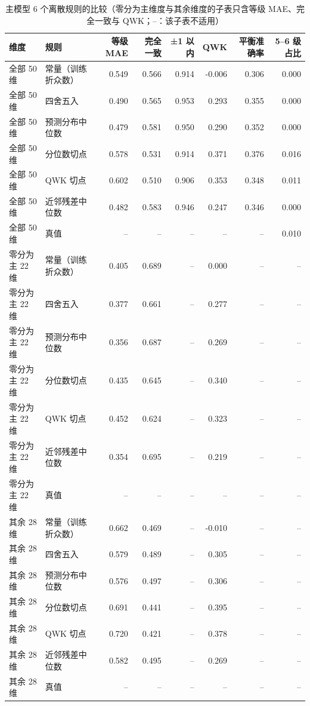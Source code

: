 \begin{table}[htbp]
\centering
\caption{主模型 6 个离散规则的比较（零分为主维度与其余维度的子表只含等级 MAE、完全一致与 QWK；--：该子表不适用）}\label{tab:q1_rules}
\begin{tabular}{llrrrrrr}
\toprule
维度 & 规则 & 等级 MAE & 完全一致 & ±1 以内 & QWK & 平衡准确率 & 5–6 级占比 \\
\midrule
全部 50 维 & 常量（训练折众数） & 0.549 & 0.566 & 0.914 & -0.006 & 0.306 & 0.000 \\
全部 50 维 & 四舍五入 & 0.490 & 0.565 & 0.953 & 0.293 & 0.355 & 0.000 \\
全部 50 维 & 预测分布中位数 & 0.479 & 0.581 & 0.950 & 0.290 & 0.352 & 0.000 \\
全部 50 维 & 分位数切点 & 0.578 & 0.531 & 0.914 & 0.371 & 0.376 & 0.016 \\
全部 50 维 & QWK 切点 & 0.602 & 0.510 & 0.906 & 0.353 & 0.348 & 0.011 \\
全部 50 维 & 近邻残差中位数 & 0.482 & 0.583 & 0.946 & 0.247 & 0.346 & 0.000 \\
全部 50 维 & 真值 & -- & -- & -- & -- & -- & 0.010 \\
零分为主 22 维 & 常量（训练折众数） & 0.405 & 0.689 & -- & 0.000 & -- & -- \\
零分为主 22 维 & 四舍五入 & 0.377 & 0.661 & -- & 0.277 & -- & -- \\
零分为主 22 维 & 预测分布中位数 & 0.356 & 0.687 & -- & 0.269 & -- & -- \\
零分为主 22 维 & 分位数切点 & 0.435 & 0.645 & -- & 0.340 & -- & -- \\
零分为主 22 维 & QWK 切点 & 0.452 & 0.624 & -- & 0.323 & -- & -- \\
零分为主 22 维 & 近邻残差中位数 & 0.354 & 0.695 & -- & 0.219 & -- & -- \\
零分为主 22 维 & 真值 & -- & -- & -- & -- & -- & -- \\
其余 28 维 & 常量（训练折众数） & 0.662 & 0.469 & -- & -0.010 & -- & -- \\
其余 28 维 & 四舍五入 & 0.579 & 0.489 & -- & 0.305 & -- & -- \\
其余 28 维 & 预测分布中位数 & 0.576 & 0.497 & -- & 0.306 & -- & -- \\
其余 28 维 & 分位数切点 & 0.691 & 0.441 & -- & 0.395 & -- & -- \\
其余 28 维 & QWK 切点 & 0.720 & 0.421 & -- & 0.378 & -- & -- \\
其余 28 维 & 近邻残差中位数 & 0.582 & 0.495 & -- & 0.269 & -- & -- \\
其余 28 维 & 真值 & -- & -- & -- & -- & -- & -- \\
\bottomrule
\end{tabular}
\end{table}
